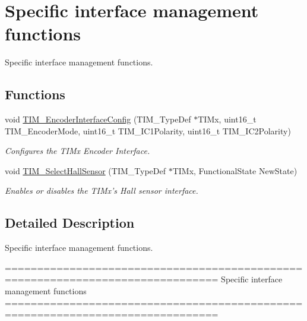 \hypertarget{group___t_i_m___group8}{\section{Specific interface management functions}
\label{group___t_i_m___group8}
}


Specific interface management functions.  


\subsection*{Functions}
\begin{DoxyCompactItemize}
\item 
void \hyperlink{group___t_i_m___group8_ga0fc7e76c47a3bd1ba1ebc71427832b51}{T\-I\-M\-\_\-\-Encoder\-Interface\-Config} (T\-I\-M\-\_\-\-Type\-Def $\ast$T\-I\-Mx, uint16\-\_\-t T\-I\-M\-\_\-\-Encoder\-Mode, uint16\-\_\-t T\-I\-M\-\_\-\-I\-C1\-Polarity, uint16\-\_\-t T\-I\-M\-\_\-\-I\-C2\-Polarity)
\begin{DoxyCompactList}\small\item\em Configures the T\-I\-Mx Encoder Interface. \end{DoxyCompactList}\item 
void \hyperlink{group___t_i_m___group8_ga42c2d1025a3937c9d9f38631af86ffa4}{T\-I\-M\-\_\-\-Select\-Hall\-Sensor} (T\-I\-M\-\_\-\-Type\-Def $\ast$T\-I\-Mx, Functional\-State New\-State)
\begin{DoxyCompactList}\small\item\em Enables or disables the T\-I\-Mx's Hall sensor interface. \end{DoxyCompactList}\end{DoxyCompactItemize}


\subsection{Detailed Description}
Specific interface management functions. \begin{DoxyVerb} ===============================================================================
                    Specific interface management functions
 ===============================================================================  \end{DoxyVerb}
 

